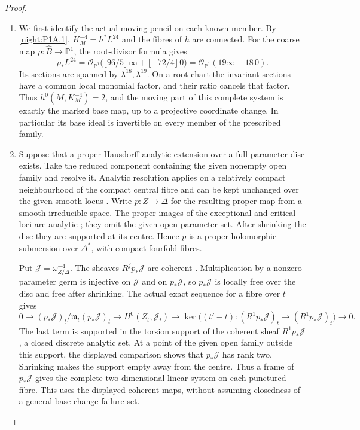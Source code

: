 \begin{proof}
\begin{enumerate}[label=\arabic*.]
\item We first identify the actual moving pencil on each known member.
By \cref{night:P1A.1}, $K_M^{-4}=h^*L^{24}$ and the fibres of $h$
are connected.  For the coarse map
$\rho:\widehat B\to\mathbb P^1$, the root-divisor formula gives
\[
 \rho_*L^{24}
 =\mathcal O_{\mathbb P^1}
   \bigl(\lfloor96/5\rfloor\,\infty+
                \lfloor-72/4\rfloor\,0\bigr)
 =\mathcal O_{\mathbb P^1}(19\infty-18\,0).
\]
Its sections are spanned by $\lambda^{18},\lambda^{19}$.
On a root chart the invariant sections have a common local
monomial factor, and their ratio cancels that factor.  Thus
$h^0(M,K_M^{-4})=2$, and the moving part of this complete
system is exactly the marked base map, up to a projective
coordinate change.  In particular its base ideal is invertible
on every member of the prescribed family.

\item Suppose that a proper Hausdorff analytic extension over a full
parameter disc exists.  Take the reduced component containing
the given nonempty open family and resolve it.  Analytic
resolution applies on a relatively compact neighbourhood of
the compact central fibre and can be kept unchanged over the
given smooth locus
\cite[Theorem 1.6 and its following analytic-neighbourhood
paragraph, preprint p.~5]{BM97}.
Write $p:Z\to\Delta$ for the resulting proper map from a smooth
irreducible space.  The proper images of the exceptional and
critical loci are analytic
\cite[\S7, Satz 1, p.~60]{Grauert60}; they omit the given open
parameter set.  After shrinking the disc they are supported
at its centre.  Hence $p$ is a proper holomorphic submersion
over $\Delta^*$, with compact fourfold fibres.

Put $\mathcal J=\omega_{Z/\Delta}^{-4}$.
The sheaves $R^jp_*\mathcal J$ are coherent
\cite[\S6, Hauptsatz I, p.~59]{Grauert60}.
Multiplication by a nonzero parameter germ is injective on
$\mathcal J$ and on $p_*\mathcal J$, so $p_*\mathcal J$ is locally free
over the disc and free after shrinking.
The actual exact sequence for a fibre over $t$ gives
\[
 0\longrightarrow(p_*\mathcal J)_t/\mathfrak m_t(p_*\mathcal J)_t
 \longrightarrow H^0(Z_t,\mathcal J_t)
 \longrightarrow
 \ker\bigl((t'-t): (R^1p_*\mathcal J)_t
                       \longrightarrow(R^1p_*\mathcal J)_t\bigr)
 \longrightarrow0.
\]
The last term is supported in the torsion support of the
coherent sheaf $R^1p_*\mathcal J$, a closed discrete analytic
set.  At a point of the given open family outside this support,
the displayed comparison shows that $p_*\mathcal J$ has rank
two.  Shrinking makes the support empty away from the centre.
Thus a frame of $p_*\mathcal J$ gives the complete two-dimensional
linear system on each punctured fibre.  This uses the displayed
coherent maps, without assuming closedness of a general
base-change failure set.


\end{enumerate}
\end{proof}
